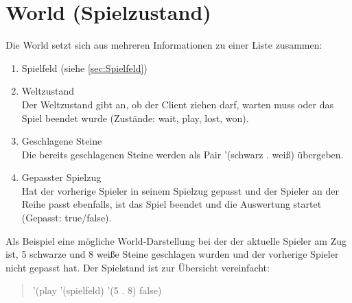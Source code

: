 \documentclass[a4paper]{scrreprt}
\begin{document}
\section{World (Spielzustand)}
\label{sec:World}
Die World setzt sich aus mehreren Informationen zu einer Liste zusammen:

\begin{enumerate}
\item Spielfeld (siehe \ref{sec:Spielfeld})
\item Weltzustand\\
Der Weltzustand gibt an, ob der Client ziehen darf, warten muss oder das Spiel beendet wurde (Zustände: wait, play, lost, won).
\item Geschlagene Steine\\
Die bereits geschlagenen Steine werden als Pair '(schwarz . weiß) übergeben.
\item Gepasster Spielzug\\
Hat der vorherige Spieler in seinem Spielzug gepasst und der Spieler an der Reihe passt ebenfalls, ist das Spiel beendet und die Auswertung startet (Gepasst: true/false). 
\end{enumerate}
Als Beispiel eine mögliche World-Darstellung bei der der aktuelle Spieler am Zug ist, 5 schwarze und 8 weiße Steine geschlagen wurden und der vorherige Spieler nicht gepasst hat. Der Spielstand ist zur Übersicht vereinfacht:
\begin{quotation}
 '(play '(spielfeld) '(5 . 8) false)
\end{quotation}
\end{document}

